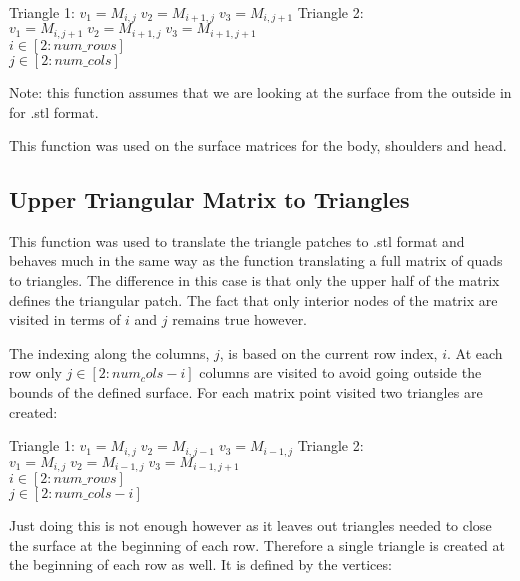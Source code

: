 \documentclass[twocolumn]{article}
\begin{document}
\vspace{2mm}
\begin{flushleft}
Triangle 1:
$v_1 = M_{i,j} \; v_2= M_{i+1,j} \; v_3 = M_{i,j+1} $
Triangle 2:
$v_1 = M_{i,j+1} \; v_2= M_{i+1,j} \; v_3 = M_{i+1,j+1} $\\
\hspace{18mm}$ i \in [2:num\_rows]$ \\
\hspace{18mm}$ j \in [2:num\_cols]$
\end{flushleft}
\vspace{2mm}

Note: this function assumes that we are looking at the surface from the outside in for .stl format.

This function was used on the surface matrices for the body, shoulders and head. 

\subsection{Upper Triangular Matrix to Triangles}

This function was used to translate the triangle patches to .stl format and behaves much in the same way as the function translating a full matrix of quads to triangles. The difference in this case is that only the upper half of the matrix defines the triangular patch. The fact that only interior nodes of the matrix are visited in terms of $i$ and $j$ remains true however.

The indexing along the columns, $j$, is based on the current row index, $i$.  At each row only $j \in [2:num_cols-i]$ columns are visited to avoid going outside the bounds of the defined surface. For each matrix point visited two triangles are created: 

\vspace{2mm}
\begin{flushleft}
Triangle 1:
$v_1 = M_{i,j} \; v_2= M_{i,j-1} \; v_3 = M_{i-1,j} $
Triangle 2:
$v_1 = M_{i,j} \; v_2= M_{i-1,j} \; v_3 = M_{i-1,j+1} $\\
\hspace{18mm}$ i \in [2:num\_rows]$ \\
\hspace{18mm}$ j \in [2:num\_cols-i]$
\end{flushleft}
\vspace{2mm}

Just doing this is not enough however as it leaves out triangles needed to close the surface at the beginning of each row. Therefore a single triangle is created at the beginning of each row as well. It is defined by the vertices:
\end{document}
